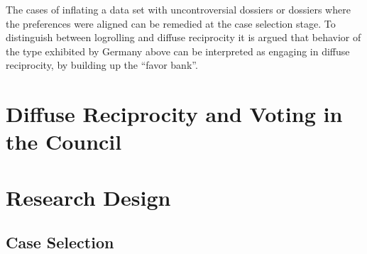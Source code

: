 The cases of inflating a data set with uncontroversial dossiers or dossiers where the preferences were aligned can be remedied at the case selection stage. To distinguish between logrolling and diffuse reciprocity it is argued that behavior of the type exhibited by Germany above can be interpreted as engaging in diffuse reciprocity, by building up the ``favor bank''. 


\section{Diffuse Reciprocity and Voting in the Council}





\section{Research Design}

\subsection{Case Selection}

